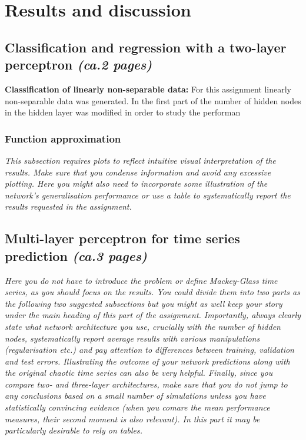 \documentclass[a4paper]{article}
\begin{document}
\section{Results and discussion}
\subsection{Classification and regression with a two-layer perceptron \textit{(ca.2 pages)}}
\textbf{Classification of linearly non-separable data:} For this assignment linearly non-separable data was generated. In the first part of the number of hidden nodes in the hidden layer was modified in order to study the performan


\subsubsection{Function approximation}
\textit{This subsection requires plots to reflect intuitive visual interpretation of the results. Make sure that you condense information and avoid any excessive plotting. Here you might also need to incorporate some illustration of the network's generalisation performance or use a table to systematically report the results requested in the assignment.}

\subsection{Multi-layer perceptron for time series prediction \textit{(ca.3 pages)}}

\textit{Here you do not have to introduce the problem or define Mackey-Glass time series, as you should focus on the results. You could divide them into two parts as the following two suggested subsections but you might as well keep your story under the main heading of this part of the assignment. Importantly, always clearly state what network architecture you use, crucially with the number of hidden nodes, systematically report average results with various manipulations (regularisation etc.) and pay attention to differences between training, validation and test errors. Illustrating the outcome of your network predictions along with the original chaotic time series can also be very helpful. Finally, since you compare two- and three-layer architectures, make sure that you do not jump to any conclusions based on a small number of simulations unless you have statistically convincing evidence (when you comare the mean performance measures, their second moment is also relevant). In this part it may be particularly desirable to rely on tables.}
\end{document}
